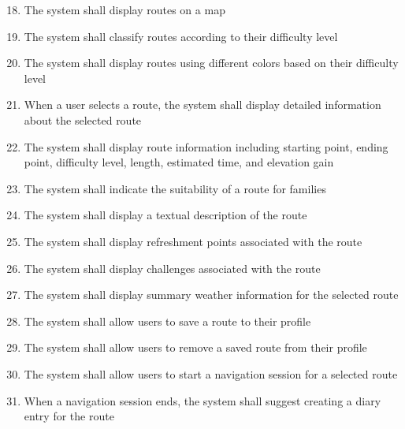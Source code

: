 \begin{enumerate}[label=\textbf{FR\arabic*}, ref=FR\arabic*]

\setcounter{enumi}{17}

\item \label{fr-smartphone:display-routes-map}
The system shall display routes on a map

\item \label{fr-smartphone:classify-routes-difficulty}
The system shall classify routes according to their difficulty level

\item \label{fr-smartphone:display-routes-color}
The system shall display routes using different colors based on their difficulty level

\item \label{fr-smartphone:route-details}
When a user selects a route, the system shall display detailed information about the selected route

\item \label{fr-smartphone:route-info}
The system shall display route information including starting point, ending point, difficulty level, length, estimated time, and elevation gain

\item \label{fr-smartphone:family-suitability}
The system shall indicate the suitability of a route for families

\item \label{fr-smartphone:route-description}
The system shall display a textual description of the route

\item \label{fr-smartphone:refreshment-points}
The system shall display refreshment points associated with the route

\item \label{fr-smartphone:route-challenges}
The system shall display challenges associated with the route

\item \label{fr-smartphone:weather-summary}
The system shall display summary weather information for the selected route

\item \label{fr-smartphone:save-route}
The system shall allow users to save a route to their profile

\item \label{fr-smartphone:remove-saved-route}
The system shall allow users to remove a saved route from their profile

\item \label{fr-smartphone:start-navigation}
The system shall allow users to start a navigation session for a selected route

\item \label{fr-smartphone:suggest-diary}
When a navigation session ends, the system shall suggest creating a diary entry for the route

\end{enumerate}




